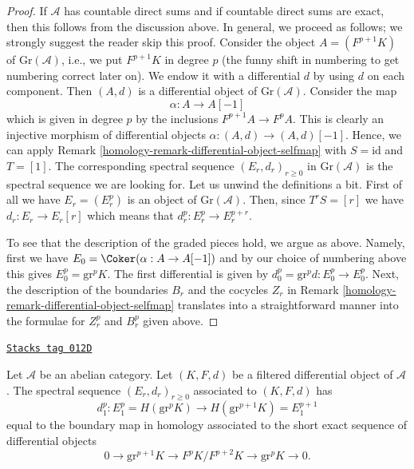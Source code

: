 \begin{proof}

If $\mathcal{A}$ has countable direct sums and if countable direct
sums are exact, then this follows from the discussion above.
In general, we proceed as follows; we strongly suggest the reader
skip this proof. Consider the object $A = (F^{p + 1}K)$ of
$\text{Gr}(\mathcal{A})$, i.e., we put $F^{p + 1}K$ in degree $p$
(the funny shift in numbering to get numbering correct later on).
We endow it with a differential $d$ by using $d$ on each component.
Then $(A, d)$ is a differential object of $\text{Gr}(\mathcal{A})$.
Consider the map
$$
\alpha : A \to A[-1]
$$
which is given in degree $p$ by the inclusions $F^{p + 1}A \to F^pA$.
This is clearly an injective morphism of differential objects
$\alpha : (A, d) \to (A, d)[-1]$. Hence, we can apply
Remark \ref{homology-remark-differential-object-selfmap}
with $S = \text{id}$ and $T = [1]$.
The corresponding spectral sequence $(E_r, d_r)_{r \geq 0}$
in $\text{Gr}(\mathcal{A})$ is the spectral sequence we are looking
for. Let us unwind the definitions a bit.
First of all we have $E_r = (E_r^p)$ is an object of $\text{Gr}(\mathcal{A})$.
Then, since $T^rS = [r]$ we have $d_r : E_r \to E_r[r]$ which means that
$d_r^p : E_r^p \to E_r^{p + r}$.

\medskip\noindent
To see that the description of the graded pieces hold, we argue
as above. Namely, first we have $E_0 = \Coker(\alpha : A \to A[-1])$
and by our choice of numbering above this gives
$E_0^p = \text{gr}^pK$. The first differential is given by
$d_0^p = \text{gr}^pd : E_0^p \to E_0^p$.
Next, the description of the boundaries $B_r$ and the cocycles $Z_r$
in Remark \ref{homology-remark-differential-object-selfmap}
translates into a straightforward manner into the formulae
for $Z_r^p$ and $B_r^p$ given above.
\end{proof}

\begin{lemma}
\label{homology-lemma-spectral-sequence-filtered-differential-d1}
\href{https://stacks.math.columbia.edu/tag/012D}{\texttt{Stacks tag 012D}}

Let $\mathcal{A}$ be an abelian category. Let $(K, F, d)$ be a filtered
differential object of $\mathcal{A}$. The spectral sequence
$(E_r, d_r)_{r \geq 0}$ associated to $(K, F, d)$ has
$$
d_1^p :
E_1^p = H(\text{gr}^pK)
\longrightarrow
H(\text{gr}^{p + 1}K) = E_1^{p + 1}
$$
equal to the boundary map in homology associated to the short
exact sequence of differential objects
$$
0 \to \text{gr}^{p + 1}K \to F^pK/F^{p + 2}K \to \text{gr}^pK \to 0.
$$
\end{lemma}

